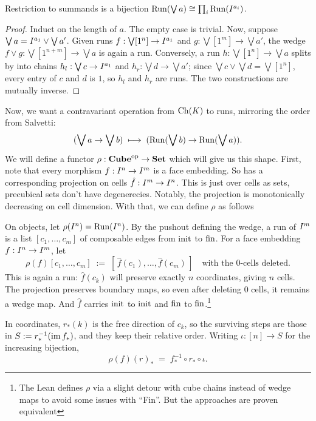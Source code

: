 \documentclass[11pt]{article}
\begin{document}
\begin{lemma}\label{lem:run-monoidal}
  Restriction to summands is a bijection $\operatorname{Run}(\bigvee a) \cong \prod_i \operatorname{Run}(I^{a_i})$.
\end{lemma}
\begin{proof}
  Induct on the length of $a$. The empty case is trivial.
  Now, suppose $\bigvee a = I^{a_1} \vee \bigvee a'$. 
  Given runs $f : \bigvee[1^n] \to I^{a_1}$ and $g : \bigvee[1^m] \to \bigvee a'$, the wedge
  $f \vee g : \bigvee[1^{n+m}] \to \bigvee a$ is again a run. Conversely, a run
  $h : \bigvee [1^n] \to \bigvee a$ splits by  into chains
  $h_l : \bigvee c \to I^{a_1}$ and $h_r : \bigvee d \to \bigvee a'$; since
  $\bigvee c \vee \bigvee d = \bigvee[1^n]$, every entry of $c$ and $d$ is $1$, so $h_l$ and
  $h_r$ are runs. The two constructions are mutually inverse.
\end{proof}

Now, we want a contravariant operation from $\operatorname{Ch}(K)$ to runs, 
mirroring the order from Salvetti:
\[
  (\bigvee a \to \bigvee b) \;\longmapsto\; (\operatorname{Run}(\bigvee b) \to \operatorname{Run}(\bigvee a)).
\]
We will define a functor $\rho:\mathbf{Cube}^{\mathrm{op}} \to \mathbf{Set}$ which will give us this shape. 
First, note that every morphism $f : I^{n} \to I^{m}$ is a face embedding. 
So has a corresponding projection on cells $\hat{f} : I^{m} \to I^{n}$.
This is just over cells as sets, precubical sets don't have degenerecies.
Notably, the projection is monotonically decreasing on cell dimension.
With that, we can define $\rho$ as follows

\begin{definition}\label{def:rho}
  On objects, let $\rho(I^{n}) = \operatorname{Run}(I^{n})$. By the pushout defining the wedge, a run of
  $I^{m}$ is a list $[c_1, \dots, c_m]$ of composable edges from $\operatorname{init}$ to $\operatorname{fin}$. For a face
  embedding $f : I^{n} \to I^{m}$, let
  \[
    \rho(f)[c_1, \dots, c_m] \;:=\; [\,\hat f(c_1), \dots, \hat f(c_m)\,]
    \quad\text{with the } 0\text{-cells deleted}.
  \]
  This is again a run: $\hat f(c_k)$ will preserve exactly $n$ coordinates, giving $n$ cells.
  The projection preserves boundary maps, so even after deleting 0 cells, it remains a wedge map.
  And $\hat f$ carries $\operatorname{init}$ to $\operatorname{init}$ and $\operatorname{fin}$ to $\operatorname{fin}$.\footnote{
    The Lean defines $\rho$ via a slight detour with cube chains instead of wedge maps 
    to avoid some issues with ``Fin''. But the approaches are proven equivalent}

  In coordinates, $r_*(k)$ is the free direction of $c_k$, so the surviving steps are those in
  $S := r_*^{-1}(\operatorname{im} f_*)$, and they keep their relative order. Writing $\iota : [n] \to S$ for the
  increasing bijection,
  \begin{equation}\label{eq:rho-restrict}
    \rho(f)(r)_* \;=\; f_*^{-1} \circ r_* \circ \iota .
  \end{equation}
\end{definition}
\end{document}
